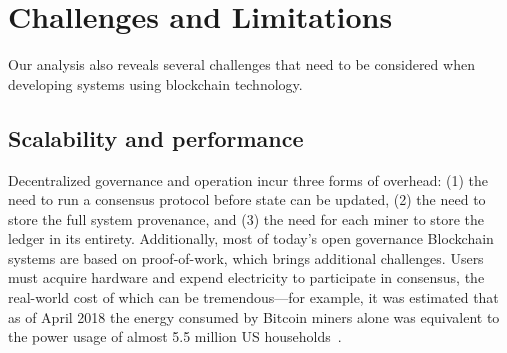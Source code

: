 \section{Challenges and Limitations}
\label{sec:challenges}

Our analysis also reveals several challenges that need to be considered when developing systems using blockchain technology.



\subsection{Scalability and performance}

Decentralized governance and operation incur three forms of overhead: (1) the 
need to run a consensus protocol before state can be updated, (2) the need to 
store the full system provenance, and (3) the need for each miner to store the 
ledger in its entirety. %
Additionally, most of today's open governance Blockchain systems are based on 
proof-of-work, which brings additional challenges.
Users must acquire hardware and expend electricity to participate in consensus, 
the real-world cost of which can be tremendous---for example, it was estimated 
that as of April 2018 the energy consumed by Bitcoin miners alone was 
equivalent to the power usage of almost 5.5 million US 
households~\cite{Digiconomist}.



